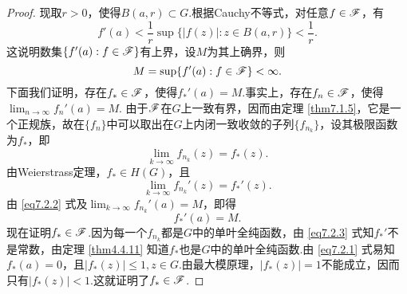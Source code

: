 \begin{proof}
  现取$r>0$，使得$B(a,r)\subset G$.根据Cauchy不等式，对任意$f\in \mathscr F$，有
  \[
    f'(a) < \frac1r\sup\{|f(z)|:z\in B(a,r)\}<\frac1r.
  \]
  这说明数集$\{f'(a):f\in\mathscr F\}$有上界，设$M$为其上确界，则
  \[
    M = \sup\{f'(a):f\in\mathscr F\}<\infty.
  \]
  下面我们证明，存在$f_\ast\in \mathscr F$，使得$f_\ast'(a)=M$.事实上，存在$f_n\in\mathscr F$，使得$\lim_{n\to\infty}f_n'(a)=M $. 由于$\mathscr F$在$G$上一致有界，因而由定理 \ref{thm7.1.5}，它是一个正规族，故在$\{f_n\}$中可以取出在$G$上内闭一致收敛的子列$\{f_{n_k}\}$，设其极限函数为$f_\ast$，即
  \begin{equation}\label{eq7.2.1}
    \lim_{k\to\infty}f_{n_k}(z) = f_\ast(z).
  \end{equation}
  由Weierstrass定理，$f_\ast\in H(G)$，且
  \begin{equation}\label{eq7.2.2}
    \lim_{k\to\infty} f_{n_k}'(z) = f_\ast'(z).
  \end{equation}
  由 \eqref{eq7.2.2} 式及$\lim_{k\to\infty}f_{n_k}'(a)=M$，即得
  \begin{equation}\label{eq7.2.3}
    f_\ast'(a) = M.
  \end{equation}
  现在证明$f_\ast\in\mathscr F$.因为每一个$f_{n_k}$都是$G$中的单叶全纯函数，由 \eqref{eq7.2.3} 式知$f_\ast'$不是常数，由定理 \ref{thm4.4.11} 知道$f_\ast$也是$G$中的单叶全纯函数.由 \eqref{eq7.2.1} 式易知$f_\ast(a)=0$，且$|f_\ast(z)|\le1,z\in G$.由最大模原理，$|f_\ast(z)|=1$不能成立，因而只有$|f_\ast(z)|<1$.这就证明了$f_\ast\in\mathscr F$.


\end{proof}
